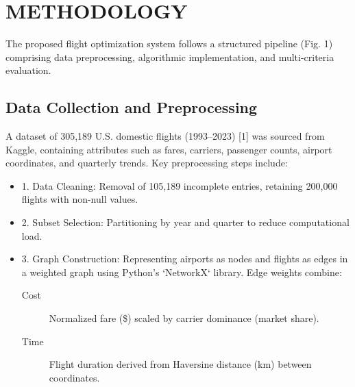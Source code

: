 \documentclass[conference]{IEEEtran}
\begin{document}
\section{METHODOLOGY}
The proposed flight optimization system follows a structured pipeline (Fig. 1) comprising data preprocessing, algorithmic implementation, and multi-criteria evaluation.  
\subsection{Data Collection and Preprocessing}
A dataset of 305,189 U.S. domestic flights (1993–2023) [1] was sourced from Kaggle, containing attributes such as fares, carriers, passenger counts, airport coordinates, and quarterly trends. Key preprocessing steps include:  
\begin{itemize}
    \item 1. Data Cleaning: Removal of 105,189 incomplete entries, retaining 200,000 flights with non-null values.  
    \item 2. Subset Selection: Partitioning by year and quarter to reduce computational load.  
    \item 3. Graph Construction: Representing airports as nodes and flights as edges in a weighted graph using Python’s `NetworkX` library. Edge weights combine:  
    \begin{description}
        \item [Cost] Normalized fare (\$) scaled by carrier dominance (market share).  
        \item [Time] Flight duration derived from Haversine distance (km) between coordinates.  
    \end{description}   

\end{itemize}
\end{document}
